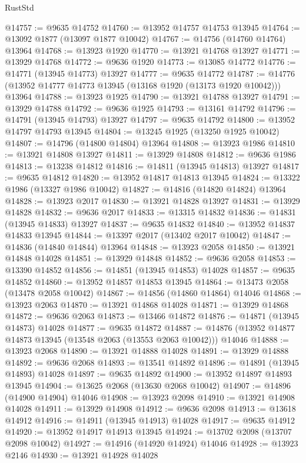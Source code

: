 \begin{lexlean}{RustStd}
\begin{coremodule}
@14757 := @9635 @14752
@14760 := @13952 @14757 @14753 @13945
@14764 := @13092 @1877 (@13097 @1877 @10042)
@14767 := @14756 (@14760 @14764) @13964
@14768 := @13923 @1920
@14770 := @13921 @14768 @13927
@14771 := @13929 @14768
@14772 := @9636 @1920
@14773 := @13085 @14772
@14776 := @14771 (@13945 @14773) @13927
@14777 := @9635 @14772
@14787 := @14776 (@13952 @14777 @14773 @13945 (@13168 @1920 (@13173 @1920 @10042))) @13964
@14788 := @13923 @1925
@14790 := @13921 @14788 @13927
@14791 := @13929 @14788
@14792 := @9636 @1925
@14793 := @13161 @14792
@14796 := @14791 (@13945 @14793) @13927
@14797 := @9635 @14792
@14800 := @13952 @14797 @14793 @13945
@14804 := @13245 @1925 (@13250 @1925 @10042)
@14807 := @14796 (@14800 @14804) @13964
@14808 := @13923 @1986
@14810 := @13921 @14808 @13927
@14811 := @13929 @14808
@14812 := @9636 @1986
@14813 := @13238 @14812
@14816 := @14811 (@13945 @14813) @13927
@14817 := @9635 @14812
@14820 := @13952 @14817 @14813 @13945
@14824 := @13322 @1986 (@13327 @1986 @10042)
@14827 := @14816 (@14820 @14824) @13964
@14828 := @13923 @2017
@14830 := @13921 @14828 @13927
@14831 := @13929 @14828
@14832 := @9636 @2017
@14833 := @13315 @14832
@14836 := @14831 (@13945 @14833) @13927
@14837 := @9635 @14832
@14840 := @13952 @14837 @14833 @13945
@14844 := @13397 @2017 (@13402 @2017 @10042)
@14847 := @14836 (@14840 @14844) @13964
@14848 := @13923 @2058
@14850 := @13921 @14848 @14028
@14851 := @13929 @14848
@14852 := @9636 @2058
@14853 := @13390 @14852
@14856 := @14851 (@13945 @14853) @14028
@14857 := @9635 @14852
@14860 := @13952 @14857 @14853 @13945
@14864 := @13473 @2058 (@13478 @2058 @10042)
@14867 := @14856 (@14860 @14864) @14046
@14868 := @13923 @2063
@14870 := @13921 @14868 @14028
@14871 := @13929 @14868
@14872 := @9636 @2063
@14873 := @13466 @14872
@14876 := @14871 (@13945 @14873) @14028
@14877 := @9635 @14872
@14887 := @14876 (@13952 @14877 @14873 @13945 (@13548 @2063 (@13553 @2063 @10042))) @14046
@14888 := @13923 @2068
@14890 := @13921 @14888 @14028
@14891 := @13929 @14888
@14892 := @9636 @2068
@14893 := @13541 @14892
@14896 := @14891 (@13945 @14893) @14028
@14897 := @9635 @14892
@14900 := @13952 @14897 @14893 @13945
@14904 := @13625 @2068 (@13630 @2068 @10042)
@14907 := @14896 (@14900 @14904) @14046
@14908 := @13923 @2098
@14910 := @13921 @14908 @14028
@14911 := @13929 @14908
@14912 := @9636 @2098
@14913 := @13618 @14912
@14916 := @14911 (@13945 @14913) @14028
@14917 := @9635 @14912
@14920 := @13952 @14917 @14913 @13945
@14924 := @13702 @2098 (@13707 @2098 @10042)
@14927 := @14916 (@14920 @14924) @14046
@14928 := @13923 @2146
@14930 := @13921 @14928 @14028

\end{coremodule}
\end{lexlean}
